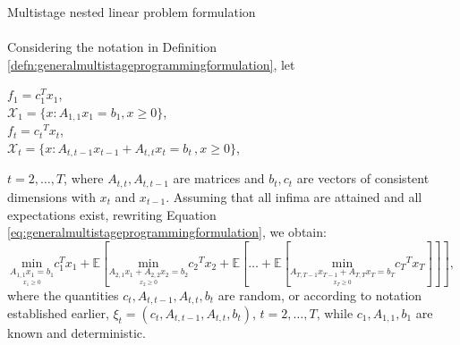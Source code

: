 \begin{defn}{Multistage nested linear problem formulation} \label{defn:nestedlinearmultistageprogrammingformulation}
\\
\cite[Ch. 1, p. 25]{stochasticprogrammingbible}
 \\
Considering the notation in Definition \ref{defn:generalmultistageprogrammingformulation}, let 
\begin{center}
$f_1=c_1^Tx_1$, \\ $\mathcal{X}_1=\{x:A_{1,1}x_1=b_1, x \geq 0 \}$, \\ $f_t = {c_t}^T x_t$, \\ $\mathcal{X}_t=\{x:A_{t,t-1}x_{t-1}+A_{t,t}x_t=b_t\, , x \geq 0\}$,  \\  
\end{center}
$t=2,\dots,T$, where $A_{t,t}, A_{t,t-1}$ are matrices and $b_t, c_t$ are vectors of consistent dimensions with $x_t$ and $x_{t-1}$.  Assuming that all infima are attained and all expectations exist, rewriting Equation \ref{eq:generalmultistageprogrammingformulation}, we obtain:
\scriptsize
\begin{equation}
\label{eq:nestedlinearmultistageprogrammingformulation}
\underset{\underset{x_1 \geq 0}{A_{1,1}x_1=b_1}}{\mathrm{min}}
 c_1^Tx_1 + \mathbb{E}\left[ \underset{\underset{x_{2} \geq 0}{A_{2,1}x_{1}+A_{2,2}x_2=b_2}}{\mathrm{min}} {c_2}^Tx_2 + \mathbb{E}\left[\dots + \mathbb{E}\left[ \underset{\underset{x_{T} \geq 0}{A_{T,T-1}x_{T-1}+A_{T,T}x_T=b_T}}{\mathrm{min}} {c_T}^Tx_T \right] \right] \right],
\end{equation}
\normalsize
where the quantities $c_t, A_{t,t-1}, A_{t,t}, b_{t}$ are random, or according to notation established earlier, $\xi_t=(c_t, A_{t,t-1}, A_{t,t}, b_{t})$, $t=2,\dots,T$, while $c_1, A_{1,1}, b_{1}$ are known and deterministic.
\end{defn}

